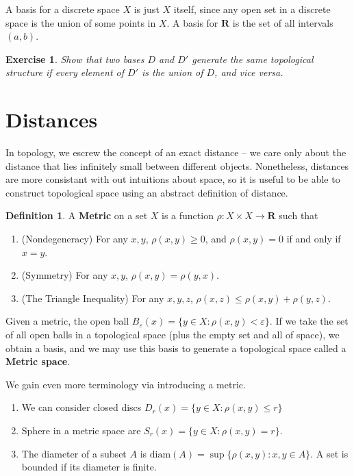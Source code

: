 \documentclass{report}
\theoremstyle{plain}
\newtheorem{exercise}{Exercise}[section]
\theoremstyle{definition}
\newtheorem*{defi}{Definition}
\newenvironment{definition}
    {\begin{samepage}\begin{framed}\begin{defi}}
    {\end{defi}\end{framed}\end{samepage}}
\begin{document}
A basis for a discrete space $X$ is just $X$ itself, since any open set in a discrete space is the union of some points in $X$. A basis for $\mathbf{R}$ is the set of all intervals $(a,b)$.

\begin{exercise}
    Show that two bases $D$ and $D'$ generate the same topological structure if every element of $D'$ is the union of $D$, and vice versa.
\end{exercise}

\section{Distances}

In topology, we escrew the concept of an exact distance -- we care only about the distance that lies infinitely small between different objects. Nonetheless, distances are more consistant with out intuitions about space, so it is useful to be able to construct topological space using an abstract definition of distance.

\begin{definition}
    A {\bf Metric} on a set $X$ is a function $\rho: X \times X \to \mathbf{R}$ such that
    \begin{enumerate}
        \item (Nondegeneracy) For any $x,y$, $\rho(x,y) \geq 0$, and $\rho(x,y) = 0$ if and only if $x = y$.
        \item (Symmetry) For any $x,y$, $\rho(x,y) = \rho(y,x)$.
        \item (The Triangle Inequality) For any $x, y, z$, $\rho(x,z) \leq \rho(x,y) + \rho(y,z)$.
    \end{enumerate}
    Given a metric, the open ball $B_\varepsilon(x) = \{ y \in X : \rho(x,y) < \varepsilon \} $. If we take the set of all open balls in a topological space (plus the empty set and all of space), we obtain a basis, and we may use this basis to generate a topological space called a {\bf Metric space}.

    We gain even more terminology via introducing a metric.

    \begin{enumerate}
        \item We can consider closed discs $D_r(x) = \{ y \in X : \rho(x,y) \leq r \}$
        \item Sphere in a metric space are $S_r(x) = \{ y \in X : \rho(x,y) = r \}$.
        \item The diameter of a subset $A$ is $\text{diam}(A) = \sup \{ \rho(x,y): x,y \in A \}$. A set is bounded if its diameter is finite.
    \end{enumerate}
\end{definition}
\end{document}
